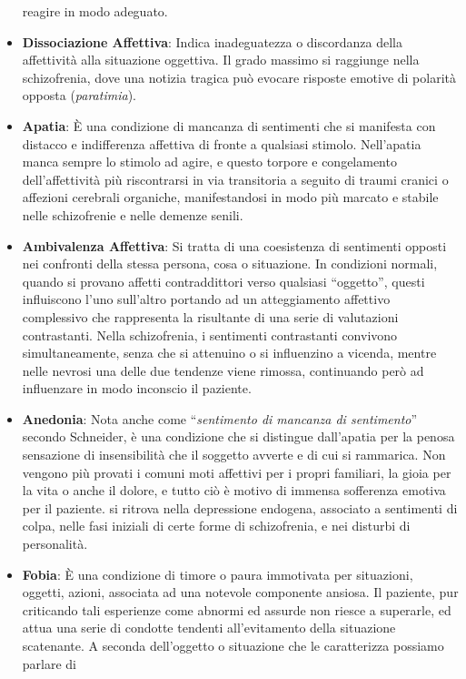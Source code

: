\documentclass[]{article}
\begin{document}
\begin{itemize}
  reagire in modo adeguato.
\item
  \textbf{Dissociazione Affettiva}: Indica inadeguatezza o discordanza
  della affettività alla situazione oggettiva. Il grado massimo si
  raggiunge nella schizofrenia, dove una notizia tragica può evocare
  risposte emotive di polarità opposta (\emph{paratimia}).
\item
  \textbf{Apatia}: È una condizione di mancanza di sentimenti che si
  manifesta con distacco e indifferenza affettiva di fronte a qualsiasi
  stimolo. Nell'apatia manca sempre lo stimolo ad agire, e questo
  torpore e congelamento dell'affettività più riscontrarsi in via
  transitoria a seguito di traumi cranici o affezioni cerebrali
  organiche, manifestandosi in modo più marcato e stabile nelle
  schizofrenie e nelle demenze senili.
\item
  \textbf{Ambivalenza Affettiva}: Si tratta di una coesistenza di
  sentimenti opposti nei confronti della stessa persona, cosa o
  situazione. In condizioni normali, quando si provano affetti
  contraddittori verso qualsiasi ``oggetto'', questi influiscono l'uno
  sull'altro portando ad un atteggiamento affettivo complessivo che
  rappresenta la risultante di una serie di valutazioni contrastanti.
  Nella schizofrenia, i sentimenti contrastanti convivono
  simultaneamente, senza che si attenuino o si influenzino a vicenda,
  mentre nelle nevrosi una delle due tendenze viene rimossa, continuando
  però ad influenzare in modo inconscio il paziente.
\item
  \textbf{Anedonia}: Nota anche come ``\emph{sentimento di mancanza di
  sentimento}'' secondo Schneider, è una condizione che si distingue
  dall'apatia per la penosa sensazione di insensibilità che il soggetto
  avverte e di cui si rammarica. Non vengono più provati i comuni moti
  affettivi per i propri familiari, la gioia per la vita o anche il
  dolore, e tutto ciò è motivo di immensa sofferenza emotiva per il
  paziente. si ritrova nella depressione endogena, associato a
  sentimenti di colpa, nelle fasi iniziali di certe forme di
  schizofrenia, e nei disturbi di personalità.
\item
  \textbf{Fobia}: È una condizione di timore o paura immotivata per
  situazioni, oggetti, azioni, associata ad una notevole componente
  ansiosa. Il paziente, pur criticando tali esperienze come abnormi ed
  assurde non riesce a superarle, ed attua una serie di condotte
  tendenti all'evitamento della situazione scatenante. A seconda
  dell'oggetto o situazione che le caratterizza possiamo parlare di

\end{itemize}
\end{document}
